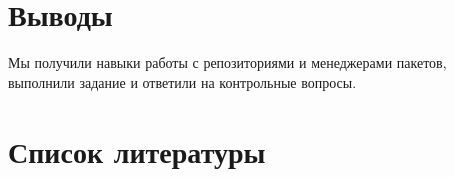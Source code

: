 \documentclass[
  12pt,
  a4paper,
  DIV=11,
  numbers=noendperiod]{scrreprt}
\begin{document}
\chapter{Выводы}\label{ux432ux44bux432ux43eux434ux44b}

Мы получили навыки работы с репозиториями и менеджерами пакетов,
выполнили задание и ответили на контрольные вопросы.

\chapter*{Список
литературы}\label{ux441ux43fux438ux441ux43eux43a-ux43bux438ux442ux435ux440ux430ux442ux443ux440ux44b}

\printbibliography[heading=none]
\end{document}
